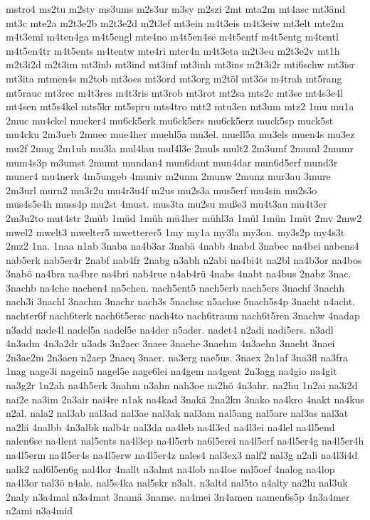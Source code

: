 {mstro4
ms2tu
m2sty
ms3ums
m2s3ur
m3sy
m2szi
2mt
mta2m
mt4asc
mt3änd
mt3c
mte2a
m2t3e2b
m2t3e2d
m2t3ef
mt3ein
m4t3eis
m4t3eiw
mt3elt
mte2m
m4t3emi
m4ten4ga
m4t5engl
mte4no
m4t5en4se
m4t5entf
m4t5entg
m4tentl
m4t5en4tr
m4t5ents
m4tentw
mte4ri
mter4n
m4t3eta
m2t3eu
m2t3e2v
mt1h
m2t3i2d
m2t3im
mt3inb
mt3ind
mt3inf
mt3inh
mt3ins
m2t3i2r
mti6schw
mt3isr
mt3ita
mtmen4s
m2tob
mt3oes
mt3ord
mt3org
m2töl
mt3ös
m4trah
mt5rang
mt5rauc
mt3rec
m4t3res
m4t3ris
mt3rob
mt3rot
mt2sa
mts2c
mt3se
mt4s3e4l
mt4sen
mt5s4kel
mts5kr
mt5spru
mts4tro
mtt2
mtu3en
mt3um
mtz2
1mu
mu1a
2muc
mu4ckel
mucker4
mu6ck5erk
mu6ck5ers
mu6ck5erz
muck5sp
muck5st
mu4cku
2m3ueb
2muec
mue4her
muehl5a
mu3el.
muell5a
mu3els
muen4s
mu3ez
mu2f
2mug
2m1uh
mu3la
mul4lau
mul4l3e
2muls
mult2
2m3umf
2muml
2mumr
mum4s3p
m3umst
2mumt
mundan4
mun6dant
mun4dar
mun6d5erf
mund3r
muner4
mu4nerk
4m5ungeb
4muniv
m2unm
2munw
2munz
mur3au
3mure
2m3url
murn2
mu3r2u
mu4r3u4f
m2us
mu2s3a
mus5erf
mu4sin
mu2s3o
mus4s5e4h
muss4p
mu2st
4must.
mus3ta
mu2su
muße3
mu4t3au
mu4t3er
2m3u2to
mut4str
2müb
1müd
1müh
mü4her
mühl3a
1mül
1mün
1müt
2mv
2mw2
mwel2
mwelt3
mwelter5
mwetterer5
1my
my1a
my3la
my3on.
my3s2p
my4s3t
2mz2
1na.
1naa
n1ab
3naba
na4b3ar
3nabä
4nabb
4nabd
3nabec
na4bei
nabens4
nab5erk
nab5er4r
2nabf
nab4fr
2nabg
n3abh
n2abi
na4bi4t
na2bl
na4b3or
na4bos
3nabö
na4bra
na4bre
na4bri
nab4rue
n4ab4rü
4nabs
4nabt
na4bus
2nabz
3nac.
3nachb
na4che
nachen4
na5chen.
nach5ent5
nach5erb
nach5ers
3nachf
3nachh
nach3i
3nachl
3nachm
3nachr
nach3s
5nachsc
n5achse
5nach5s4p
3nacht
n4acht.
nachter6f
nach6terk
nach6t5ersc
nach4to
nach6traum
nach6t5ren
3nachw
4nadap
n3add
nade4l
nadel5a
nadel5e
na4der
n5ader.
nadet4
n2adi
nadi5ers.
n3adl
4n3adm
4n3a2dr
n3ads
3n2aec
3naee
3naehe
3naehm
4n3aehn
3naeht
3naei
2n3ae2m
2n3aen
n2aep
2naeq
3naer.
na3erg
nae5us.
3naex
2n1af
3na3fl
na3fra
1nag
nage3i
nagein5
nagel5e
nage6lei
na4gem
na4gent
2n3agg
na4gio
na4git
na3g2r
1n2ah
na4h5erk
3nahm
n3ahn
nah3oe
na2hö
4n3ahr.
na2hu
1n2ai
na3i2d
nai2e
na3im
2n3air
nai4re
n1ak
na4kad
3nakä
2na2kn
3nako
na4kro
4nakt
na4kus
n2al.
nala2
nal3ab
nal3ad
nal3ae
nal3ak
nal3am
nal5ang
nal5are
nal3as
nal3at
na2lä
4nalbb
4n3albk
nalb4r
nal3da
na4leb
na4l3ed
na4l3ei
na4lel
na4l5end
nalen6se
na4lent
nal5ents
na4l3ep
na4l5erb
na6l5erei
na4l5erf
na4l5er4g
na4l5er4h
na4l5erm
na4l5er4s
na4l5erw
na4l5er4z
nales4
nal3ex3
nalf2
nal3g
n2ali
na4l3i4d
nalk2
nal6l5en6g
nal4lor
4nallt
n3almt
na4lob
na4loe
nal5oef
4nalog
na4lop
na4l3or
nal3ö
n4als.
nal5s4ka
nal5skr
n3alt.
n3altd
nal5to
n4alty
na2lu
nal3uk
2naly
n3a4mal
n3a4mat
3namä
3name.
na4mei
3n4amen
namen6s5p
4n3a4mer
n2ami
n3a4mid
}

